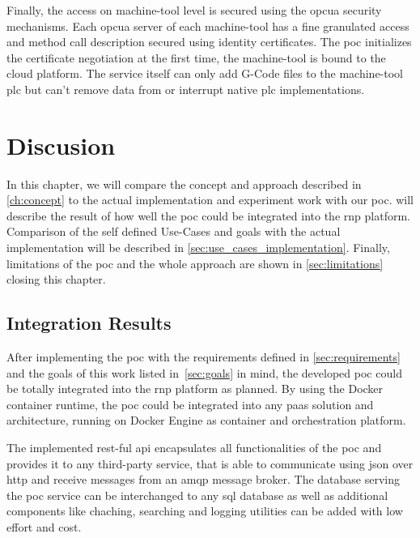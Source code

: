 \documentclass[
a4paper,
twoside,
headsepline,
cleardoublepage=empty,
parskip=half,
draft=false
]{scrbook}
\begin{document}
				Finally, the access on machine-tool level is secured using the \gls{opcua} security mechanisms. Each \gls{opcua} server of each machine-tool has a fine granulated access and method call description secured using identity certificates. The \gls{poc} initializes the certificate negotiation at the first time, the machine-tool is bound to the cloud platform. The service itself can only add G-Code files to the machine-tool \gls{plc} but can't remove data from or interrupt native \gls{plc} implementations.

	\chapter{Discusion} \label{ch:discusion}

		In this chapter, we will compare the concept and approach described in \cref{ch:concept} to the actual implementation and experiment work with our \gls{poc}.  will describe the result of how well the \gls{poc} could be integrated into the \gls{rnp} platform. Comparison of the self defined Use-Cases and goals with the actual implementation will be described in \cref{sec:use_cases_implementation}. Finally, limitations of the \gls{poc} and the whole approach are shown in \cref{sec:limitations} closing this chapter.

		\section{Integration Results}\label{sec:integration_results}

			After implementing the \gls{poc} with the requirements defined in \cref{sec:requirements} and the goals of this work listed in~\cref{sec:goals} in mind, the developed \gls{poc} could be totally integrated into the \gls{rnp} platform as planned. By using the Docker container runtime, the \gls{poc} could be integrated into any \gls{paas} solution and architecture, running on Docker Engine as container and orchestration platform.

			The implemented \gls{rest}-ful \gls{api} encapsulates all functionalities of the \gls{poc} and provides it to any third-party service, that is able to communicate using \gls{json} over \gls{http} and receive messages from an \gls{amqp} message broker. The database serving the \gls{poc} service can be interchanged to any \gls{sql} database as well as additional components like chaching, searching and logging utilities can be added with low effort and cost.
\end{document}
